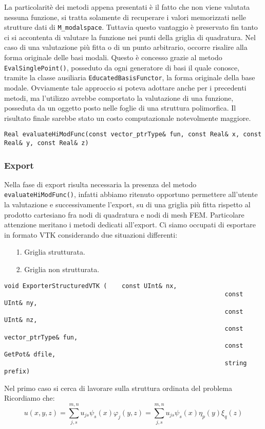 La particolarit\`e dei metodi appena presentati \`e il fatto che non viene valutata nessuna funzione, si tratta solamente di recuperare i valori 
memorizzati nelle strutture dati di \texttt{M\_modalspace}. Tuttavia questo vantaggio \`e preservato fin tanto ci si accontenta di valutare la 
funzione nei punti della griglia di quadratura. Nel caso di una valutazione pi\`u fitta o di un punto arbitrario, occorre risalire alla forma 
originale delle basi modali. Questo \`e concesso grazie al metodo \texttt{EvalSinglePoint()}, posseduto da ogni generatore di basi il quale 
conosce, tramite la classe ausiliaria  \texttt{EducatedBasisFunctor}, la forma originale della base modale. Ovviamente tale approccio si poteva 
adottare anche per i precedenti metodi, ma l'utilizzo avrebbe comportato la valutazione di una funzione, posseduta da un oggetto posto nelle 
foglie di una struttura polimorfica. Il risultato finale sarebbe stato un costo computazionale notevolmente maggiore.
\begin{lstlisting}[style = general, frame = none]
Real evaluateHiModFunc(const vector_ptrType& fun, const Real& x, const Real& y, const Real& z)
\end{lstlisting}


\subsubsection{Export}

Nella fase di export risulta necessaria la presenza del metodo \texttt{evaluateHiModFunc()}, infatti abbiamo ritenuto opportuno permettere 
all'utente la valutazione e successivamente l'export, su di una griglia pi\`u fitta rispetto al prodotto cartesiano fra nodi di quadratura e 
nodi di mesh FEM. 
Particolare attenzione meritano i metodi dedicati all'export. Ci siamo occupati di esportare in formato VTK considerando due situazioni 
differenti:
\begin{itemize}
\item[1.] Griglia strutturata.
\item[2.] Griglia non strutturata.
\end{itemize}
\begin{lstlisting}[style = general]
void ExporterStructuredVTK (	const UInt& nx,
															const UInt& ny,
															const UInt& nz,
															const vector_ptrType& fun,
															const GetPot& dfile, 
															string prefix)
\end{lstlisting}
Nel primo caso si cerca di lavorare sulla struttura ordinata del problema
Ricordiamo che:
\begin{equation}
u(x,y,z) = \sum_{j,s}^{m,n}u_{js}\psi_s(x)\varphi_j(y,z) = \sum_{j,s}^{m,n}u_{js}\psi_s(x)\eta_p(y)\xi_q(z)
\end{equation}

